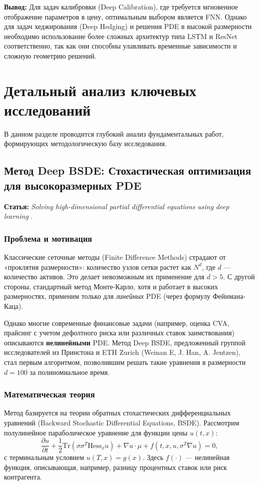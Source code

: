 \documentclass[12pt, a4paper]{article}
\begin{document}
\textbf{Вывод:} Для задач калибровки (Deep Calibration), где требуется мгновенное отображение параметров в цену, оптимальным выбором является FNN. Однако для задач хеджирования (Deep Hedging) и решения PDE в высокой размерности необходимо использование более сложных архитектур типа LSTM и ResNet соответственно, так как они способны улавливать временные зависимости и сложную геометрию решений.

\section{Детальный анализ ключевых исследований}

В данном разделе проводится глубокий анализ фундаментальных работ, формирующих методологическую базу исследования.

\subsection{Метод Deep BSDE: Стохастическая оптимизация для высокоразмерных PDE}
\textbf{Статья:} \textit{Solving high-dimensional partial differential equations using deep learning} \cite{Han2018}.

\subsubsection{Проблема и мотивация}
Классические сеточные методы (Finite Difference Methods) страдают от «проклятия размерности»: количество узлов сетки растет как $N^d$, где $d$ — количество активов. Это делает невозможным их применение для $d > 5$. С другой стороны, стандартный метод Монте-Карло, хотя и работает в высоких размерностях, применим только для \textit{линейных} PDE (через формулу Фейнмана-Каца).

Однако многие современные финансовые задачи (например, оценка CVA, прайсинг с учетом дефолтного риска или различных ставок заимствования) описываются \textbf{нелинейными} PDE. Метод Deep BSDE, предложенный группой исследователей из Принстона и ETH Zurich (Weinan E, J. Han, A. Jentzen), стал первым алгоритмом, позволившим решать такие уравнения в размерности $d=100$ за полиномиальное время.

\subsubsection{Математическая теория}
Метод базируется на теории обратных стохастических дифференциальных уравнений (Backward Stochastic Differential Equations, BSDE). Рассмотрим полулинейное параболическое уравнение для функции цены $u(t, x)$:
\begin{equation}
    \frac{\partial u}{\partial t} + \frac{1}{2}\text{Tr}(\sigma\sigma^T \text{Hess}_x u) + \nabla u \cdot \mu + f(t, x, u, \sigma^T \nabla u) = 0,
\end{equation}
с терминальным условием $u(T, x) = g(x)$. Здесь $f(\cdot)$ — нелинейная функция, описывающая, например, разницу процентных ставок или риск контрагента.
\end{document}
